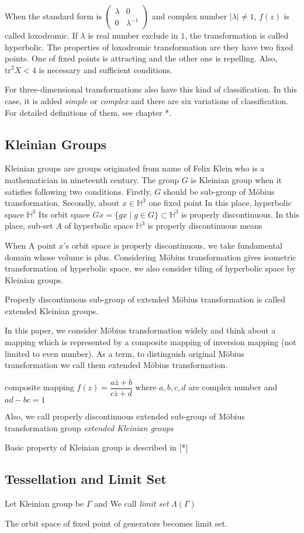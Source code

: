 When the standard form is
$\begin{pmatrix}\lambda & 0 \\ 0 & \lambda^{-1} \end{pmatrix}$
and complex number $|\lambda| \neq 1$, $f(z)$ is called loxodromic.
If $\lambda$ is real number exclude in $1$, the transformation is called
hyperbolic.
The properties of loxodromic transformation are they have two fixed
points. One of fixed points is attracting and the other one is repelling.
Also, $\mathrm{tr}^2X < 4$ is necessary and sufficient conditions.

For three-dimensional transformations also have this kind of
classification.
In this case, it is added \textit{simple} or \textit{complex} and
there are six variations of classification.
For detailed definitions of them, see chapter *.

\subsection{Kleinian Groups}

Kleinian groups are groups originated from name of Felix Klein who is
a mathematician in nineteenth century.
The group $G$ is Kleinian group when it satisfies following two
conditions. 
Firstly, $G$ should be sub-group of M\"obius transformation.
Secondly, about $x\in\mathbb{H}^3$ one fixed point 
In this place, hyperbolic space $\mathbb{H}^3$
Its orbit space $Gx = \{ gx \mid g\in G\}\subset \mathbb{H}^3$
is properly discontinuous.
In this place, sub-set $A$ of hyperbolic space $\mathbb{H}^3$
is properly discontinuous means 

When A point $x$'s orbit space is properly discontinuous, we take
fundamental domain whose volume is plus.
Considering M\"obius transformation gives isometric transformation of
hyperbolic space, we also consider tiling of hyperbolic space by
Kleinian groups. 

Properly discontinuous sub-group of extended M\"obius transformation
is called extended Kleinian groups.

In this paper, we consider M\"obius transformation widely and
think about a mapping which is represented by a  composite mapping of
inversion mapping (not limited to even number).
As a term, to distinguish original M\"obius transformation
we call them extended M\"obius transformation.

composite mapping $f(z)=\dfrac{a{\bar{z}}+b}{c{\bar{z}}+d}$ where
$a, b, c, d$ are complex number and $ad-bc = 1$


Also, we call properly discontinuous extended sub-group of M\"obius
 transformation group \textit{extended Kleinian groups}

Basic property of Kleinian group is described in [*]

\subsection{Tessellation and Limit Set}

Let Kleinian group be $\Gamma$ and 
We call \textit{limit set} $\Lambda(\Gamma)$

The orbit space of fixed point of generators becomes limit set.